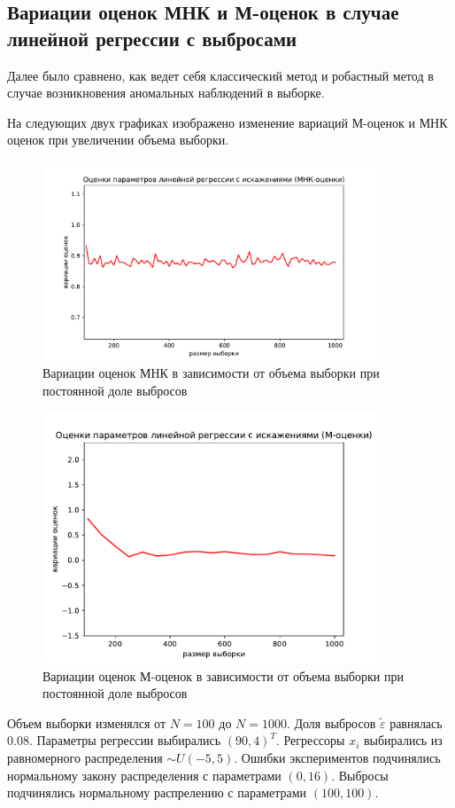\subsection{Вариации оценок МНК и М-оценок в случае линейной регрессии с выбросами}\label{ss_1}
Далее было сравнено, как ведет себя классический метод и робастный метод в случае возникновения аномальных наблюдений в выборке.

На следующих двух графиках изображено изменение вариаций М-оценок и МНК оценок при увеличении объема выборки.

\begin{figure}[h!]
    \centering
    \includegraphics[width=100mm]{../images/OLS.pdf}
    \caption{Вариации оценок МНК в зависимости от объема выборки при постоянной доле выбросов\label{overflow}}
    \label{pic_ols}
\end{figure}

\begin{figure}[h!]
    \centering
    \includegraphics[width=100mm]{../images/RLM.pdf}
    \caption{Вариации оценок М-оценок в зависимости от объема выборки при постоянной доле выбросов\label{overflow}}
\end{figure}

Объем выборки изменялся от $N=100$ до $N=1000$. 
Доля выбросов $\widetilde{\varepsilon}$ равнялась $0.08$. 
Параметры регрессии выбирались $(90, 4)^T$. 
Регрессоры $x_i$ выбирались из равномерного распределения $\sim U(-5,5)$. 
Ошибки экспериментов подчинялись нормальному закону распределения с параметрами $(0, 16)$. Выбросы подчинялись нормальному распрелению с параметрами $(100, 100)$. 

